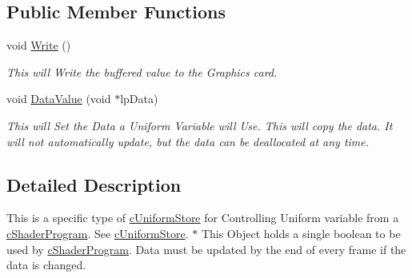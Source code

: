 \subsection*{Public Member Functions}
\begin{DoxyCompactItemize}
\item 
\hypertarget{classc_uniform_boolean_vector1_a277b15698b3273bc0dbaac21b160982d}{
void \hyperlink{classc_uniform_boolean_vector1_a277b15698b3273bc0dbaac21b160982d}{Write} ()}
\label{classc_uniform_boolean_vector1_a277b15698b3273bc0dbaac21b160982d}

\begin{DoxyCompactList}\small\item\em This will Write the buffered value to the Graphics card. \end{DoxyCompactList}\item 
\hypertarget{classc_uniform_boolean_vector1_a3218f935ae7cdc32679db5eed40f6936}{
void \hyperlink{classc_uniform_boolean_vector1_a3218f935ae7cdc32679db5eed40f6936}{DataValue} (void $\ast$lpData)}
\label{classc_uniform_boolean_vector1_a3218f935ae7cdc32679db5eed40f6936}

\begin{DoxyCompactList}\small\item\em This will Set the Data a Uniform Variable will Use. This will copy the data. It will not automatically update, but the data can be deallocated at any time. \end{DoxyCompactList}\end{DoxyCompactItemize}


\subsection{Detailed Description}
This is a specific type of \hyperlink{classc_uniform_store}{cUniformStore} for Controlling Uniform variable from a \hyperlink{classc_shader_program}{cShaderProgram}. See \hyperlink{classc_uniform_store}{cUniformStore}. $\ast$ This Object holds a single boolean to be used by \hyperlink{classc_shader_program}{cShaderProgram}. Data must be updated by the end of every frame if the data is changed. 